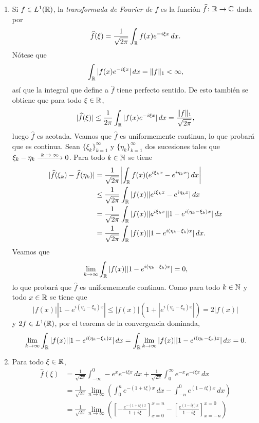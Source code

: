 \documentclass[a4paper, 12pt, extrafontsizes]{memoir}
\begin{document}
\begin{solution}
\hfill
\begin{enumerate}
    \item Si $f \in L^1(\mathbb R)$, la \emph{transformada de Fourier de $f$} es la función $\widehat{f} \colon \mathbb R \to \mathbb C$ dada por
    \[\widehat{f}(\xi)  = \frac{1}{\sqrt{2\pi}}\int_\mathbb R f(x)e^{-i\xi x} \, dx.\]
    Nótese que
    \[\int_\mathbb R |f(x)e^{-i\xi x}| \, dx = \|f\|_1 < \infty,\]
    así que la integral que define a $\widehat{f}$ tiene perfecto sentido. De esto también se obtiene que para todo $\xi \in \mathbb R$,
    \[|\widehat{f}(\xi)| \leq \frac{1}{2\pi}\int_\mathbb R|f(x)e^{-i\xi x}| \, dx = \frac{\|f\|_1}{\sqrt{2\pi}},\]
    luego $\widehat{f}$ es acotada. Veamos que $\widehat{f}$ es uniformemente continua, lo que probará que es continua. Sean $\{\xi_k\}_{k=1}^\infty$ y $\{\eta_k\}_{k=1}^\infty$ dos sucesiones tales que $\xi_k-\eta_k \kconv 0$. Para todo $k \in \mathbb N$ se tiene
    \begin{align*}
        |\widehat{f}(\xi_k) - \widehat{f}(\eta_k)| &=\frac{1}{\sqrt{2\pi}} \biggl|\int_\mathbb R f(x)(e^{i\xi_k x}-e^{i\eta_k x}) \, dx\biggr| \\
        &\leq \frac{1}{\sqrt{2\pi}} \int_\mathbb R |f(x)||e^{i\xi_k x} - e^{i\eta_kx}| \, dx \\
        &= \frac{1}{\sqrt{2\pi}} \int_\mathbb R |f(x)||e^{i\xi_kx}||1 - e^{i(\eta_k-\xi_k)x}| \, dx \\
        &= \frac{1}{\sqrt{2\pi}} \int_\mathbb R |f(x)||1 - e^{i(\eta_k-\xi_k)x}| \, dx.
    \end{align*}
    Veamos que
    \[\lim_{k \to \infty} \int_\mathbb R |f(x)||1 - e^{i(\eta_k-\xi_k)x}| = 0, \]
    lo que probará que $\widehat{f}$ es uniformemente continua. Como para todo $k \in \mathbb N$ y todo $x \in \mathbb R$ se tiene que
    \[|f(x)||1-e^{i(\eta_k-\xi_k)x}| \leq |f(x)|(1+|e^{i(\eta_k-\xi_k)x}|) = 2|f(x)|\]
    y $2f \in L^1(\mathbb R)$, por el teorema de la convergencia dominada,
    \[\lim_{k \to \infty} \int_\mathbb R |f(x)||1 - e^{i(\eta_k-\xi_k)x}|\, dx =\int_\mathbb R \lim_{k \to \infty} |f(x)||1 - e^{i(\eta_k-\xi_k)x}| \, dx = 0. \]
    \item Para todo $\xi \in \mathbb R$,
    \begin{align*}
        \widehat{f}(\xi) &= \frac{1}{\sqrt{2\pi}}\int_{-\infty}^0 -e^xe^{-i\xi x} \, dx+\frac{1}{\sqrt{2\pi}}\int_{0}^\infty e^{-x}e^{-i\xi x} \, dx \\
        &= \frac{1}{\sqrt{2\pi}}\lim_{n \to \infty}\left(\int_{0}^ne^{-(1+i\xi)x} \, dx - \int_{-n}^0 e^{(1-i\xi)x} \, dx\right) \\
        &= \frac{1}{\sqrt{2\pi}}\lim_{n \to \infty}\left(\left[-\frac{e^{-(1+i\xi)x}}{1+i\xi}\right]_{x=0}^{x=n} - \left[\frac{e^{(1-i\xi)x}}{1-i\xi}\right]_{x=-n}^{x=0}\right) \\

\end{align*}
\end{enumerate}
\end{solution}
\end{document}
